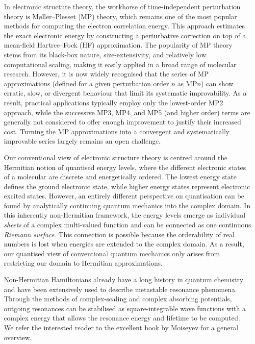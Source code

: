 \documentclass[aps,prb,reprint,noshowkeys,superscriptaddress]{revtex4-1}
\begin{document}
In electronic structure theory, the workhorse of time-independent perturbation theory is M\o{}ller--Plesset (MP) %
theory,\cite{Moller_1934} which remains one of the most popular methods for computing the electron 
correlation energy.\cite{Wigner_1934,Lowdin_1958}
This approach estimates the exact electronic energy by constructing a perturbative correction on top
of a mean-field Hartree--Fock (HF) approximation.\cite{SzaboBook}
The popularity of MP theory stems from its black-box nature, size-extensivity, and relatively low computational scaling, 
making it easily applied in a broad range of molecular research.\cite{HelgakerBook}
However, it is now widely recognised that the series of MP approximations (defined for a given perturbation
order $n$ as MP$n$) can show erratic, slow, or divergent behaviour that limit its systematic improvability.%
\cite{Laidig_1985,Knowles_1985,Handy_1985,Gill_1986,Laidig_1987,Nobes_1987,Gill_1988,Gill_1988a,Lepetit_1988} 
As a result, practical applications typically employ only the lowest-order MP2 approach, while 
the successive MP3, MP4, and MP5 (and higher order) terms are generally not considered to offer enough improvement
to justify their increased cost.
Turning the MP approximations into a convergent and 
systematically improvable series largely remains an open challenge.

Our conventional view of electronic structure theory is centred around the Hermitian notion of quantised energy levels,
where the different electronic states of a molecular are discrete and energetically ordered.
The lowest energy state defines the ground electronic state, while higher energy states
represent electronic excited states.
However, an entirely different perspective on quantisation can be found by analytically continuing
quantum mechanics into the complex domain.
In this inherently non-Hermitian framework, the energy levels emerge as individual \textit{sheets} of a complex
multi-valued function and can be connected as one continuous \textit{Riemann surface}.\cite{BenderPTBook}
This connection is possible because the orderability of real numbers is lost when energies are extended to the
complex domain.
As a result, our quantised view of conventional quantum mechanics only arises from
restricting our domain to Hermitian approximations.

Non-Hermitian Hamiltonians already have a long history in quantum chemistry and have been extensively used to 
describe metastable resonance phenomena.\cite{MoiseyevBook}
Through the methods of complex-scaling\cite{Moiseyev_1998} and complex absorbing 
potentials,\cite{Riss_1993,Ernzerhof_2006,Benda_2018} outgoing resonances can be stabilised as square-integrable
wave functions with a complex energy that allows the resonance energy and lifetime to be computed.
We refer the interested reader to the excellent book by Moiseyev for a general overview. \cite{MoiseyevBook}
\end{document}
